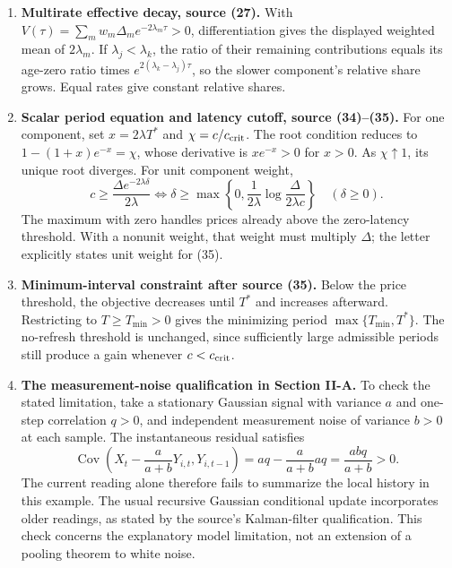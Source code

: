 \documentclass[11pt,letterpaper]{article}
\newcommand{\Cov}{\operatorname{Cov}}
\begin{document}
\begin{enumerate}
The letter only transfers the endpoint and pooling laws. For example, over a discrete reception interval of $N$ slots, the accumulated value is the sum $\sum_m A_m(1-q_m^{2N})/(1-q_m^2)$ under ages counted from the reception slot. The continuous-time integral and the continuous positive root in Theorem 2 are not asserted verbatim for integer refresh periods.

\item \textbf{Multirate effective decay, source (27).}
With $V(\tau)=\sum_mw_m\Delta_m e^{-2\lambda_m\tau}>0$, differentiation gives the displayed weighted mean of $2\lambda_m$. If $\lambda_j<\lambda_k$, the ratio of their remaining contributions equals its age-zero ratio times $e^{2(\lambda_k-\lambda_j)\tau}$, so the slower component's relative share grows. Equal rates give constant relative shares.

\item \textbf{Scalar period equation and latency cutoff, source (34)--(35).}
For one component, set $x=2\lambda T^*$ and $\chi=c/c_{\rm crit}$. The root condition reduces to $1-(1+x)e^{-x}=\chi$, whose derivative is $xe^{-x}>0$ for $x>0$. As $\chi\uparrow1$, its unique root diverges. For unit component weight,
\[
c\ge\frac{\Delta e^{-2\lambda\delta}}{2\lambda}
\iff
\delta\ge\max\left\{0,\frac{1}{2\lambda}\log\frac{\Delta}{2\lambda c}\right\}
\quad(\delta\ge0).
\]
The maximum with zero handles prices already above the zero-latency threshold. With a nonunit weight, that weight must multiply $\Delta$; the letter explicitly states unit weight for (35).

\item \textbf{Minimum-interval constraint after source (35).}
Below the price threshold, the objective decreases until $T^*$ and increases afterward. Restricting to $T\ge T_{\min}>0$ gives the minimizing period $\max\{T_{\min},T^*\}$. The no-refresh threshold is unchanged, since sufficiently large admissible periods still produce a gain whenever $c<c_{\rm crit}$.

\item \textbf{The measurement-noise qualification in Section II-A.}
To check the stated limitation, take a stationary Gaussian signal with variance $a$ and one-step correlation $q>0$, and independent measurement noise of variance $b>0$ at each sample. The instantaneous residual satisfies
\[
\Cov\left(X_t-\frac{a}{a+b}Y_{i,t},Y_{i,t-1}\right)
=aq-\frac{a}{a+b}aq=\frac{abq}{a+b}>0.
\]
The current reading alone therefore fails to summarize the local history in this example. The usual recursive Gaussian conditional update incorporates older readings, as stated by the source's Kalman-filter qualification. This check concerns the explanatory model limitation, not an extension of a pooling theorem to white noise.
\end{enumerate}
\end{document}
